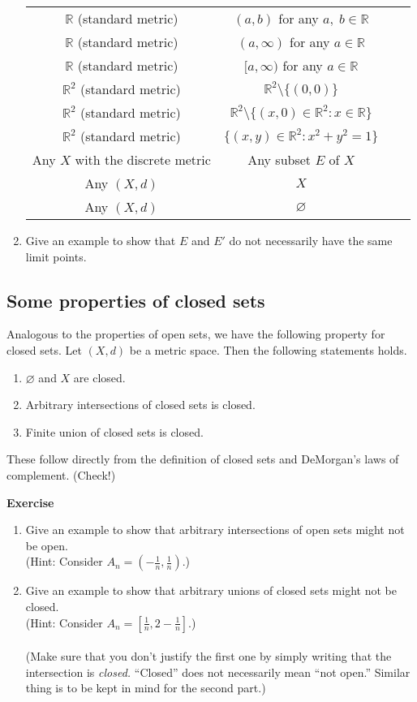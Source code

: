\documentclass{article}
\let\emptyset\varnothing
\newcounter{exercise}
\newcommand{\exercise}{\refstepcounter{exercise}\par\medskip
   {\textbf{Exercise \theexercise }} \rmfamily}
\begin{document}
\begin{enumerate}[nosep]
\begin{tabular}{|c|c|c|c|}
			$\mathbb{R}$ (standard metric) & $(a, b)$ for any $a,\;b \in \mathbb{R}$ & & \\
			$\mathbb{R}$ (standard metric) & $(a, \infty)$ for any $a \in \mathbb{R}$ & & \\
			$\mathbb{R}$ (standard metric) & $[a, \infty)$ for any $a \in \mathbb{R}$ & & \\
			$\mathbb{R}^2$ (standard metric) & $\mathbb{R}^2 \setminus \{(0, 0)\}$ & & \\
			$\mathbb{R}^2$ (standard metric) & $\mathbb{R}^2 \setminus \{(x, 0) \in \mathbb{R}^2 : x \in \mathbb{R}\}$ & & \\
			$\mathbb{R}^2$ (standard metric) & $\{(x, y) \in \mathbb{R}^2 : x^2 + y^2 = 1\}$ & & \\

			Any $X$ with the discrete metric & Any subset $E$ of $X$ & & \\
			Any $(X, d)$ & $X$ & & \\
			Any $(X, d)$ & $\emptyset$ & & \\
			\hline	
		\end{tabular}
		\item Give an example to show that $E$ and $E'$ do not necessarily have the same limit points.
	\end{enumerate}
	\subsection{Some properties of closed sets}
	Analogous to the properties of open sets, we have the following property for closed sets.
	Let $(X, d)$ be a metric space. Then the following statements holds.
	\begin{enumerate} 
		\item $\emptyset$ and $X$ are closed.
		\item Arbitrary intersections of closed sets is closed.
		\item Finite union of closed sets is closed.
	\end{enumerate}
	These follow directly from the definition of closed sets and DeMorgan's laws of complement. (Check!)\\
	\exercise
	\begin{enumerate}[nosep] 
		\item Give an example to show that arbitrary intersections of open sets might not be open.\\
		(Hint: Consider $A_n = \left(-\frac{1}{n}, \frac{1}{n}\right).$)
		\item Give an example to show that arbitrary unions of closed sets might not be closed.\\
		(Hint: Consider $A_n = \left[\frac{1}{n}, 2-\frac{1}{n}\right].$)\\~\\
		(Make sure that you don't justify the first one by simply writing that the intersection is \emph{closed.} ``Closed'' does not necessarily mean ``not open.'' Similar thing is to be kept in mind for the second part.)

	\end{enumerate}
\end{document}
